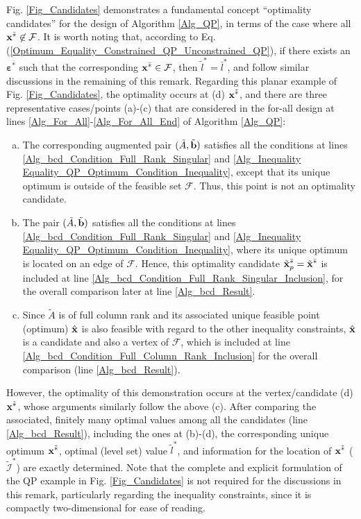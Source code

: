 \documentclass{imaman}
\newcommand{\bfb}{{\bf b}}
\newcommand{\bfx}{{\bf x}}
\newcommand{\bfvarepsilon}{{\boldsymbol \varepsilon}}
\newcommand{\calF}{{\mathcal F}}
\newcommand{\calI}{{\mathcal I}}
\numberwithin{equation}{section}
\begin{document}
\begin{remark}
Fig. \ref{Fig_Candidates} demonstrates a fundamental concept ``optimality candidates'' for the design of Algorithm \ref{Alg_QP}, in terms of the case where all $\bfx^{\bar *}\not\in\calF$. It is worth noting that, according to Eq. (\ref{Optimum_Equality_Constrained_QP_Unconstrained_QP}), if there exists an $\bfvarepsilon^{\bar *}$ such that the corresponding $\bfx^{\bar *}\in\calF$, then $\tilde l^*=\bar l^*$, and follow similar discussions in the remaining of this remark. Regarding this planar example of Fig. \ref{Fig_Candidates}, the optimality occurs at (d) $\bfx^{\tilde *}$, and there are three representative cases/points (a)-(c) that are considered in the for-all design at lines \ref{Alg_For_All}-\ref{Alg_For_All_End} of Algorithm \ref{Alg_QP}:
\begin{enumerate}[a)]
\item The corresponding augmented pair $(\tilde A,\tilde\bfb)$ satisfies all the conditions at lines \ref{Alg_bcd_Condition_Full_Rank_Singular} and \ref{Alg_Inequality Equality_QP_Optimum_Condition_Inequality}, except that its unique optimum is outside of the feasible set $\calF$. Thus, this point is not an optimality candidate.
\item The pair $(\tilde A, \tilde\bfb)$ satisfies all the conditions at lines \ref{Alg_bcd_Condition_Full_Rank_Singular} and \ref{Alg_Inequality Equality_QP_Optimum_Condition_Inequality}, where its unique optimum is located on an edge of $\calF$. Hence, this optimality candidate $\tilde\bfx_p^{\bar *}=\tilde\bfx^{\bar *}$ is included at line \ref{Alg_bcd_Condition_Full_Rank_Singular_Inclusion}, for the overall comparison later at line \ref{Alg_bcd_Result}.
\item Since $\tilde A$ is of full column rank and its associated unique feasible point (optimum) $\hat\bfx$ is also feasible with regard to the other inequality constraints, $\hat\bfx$ is a candidate and also a vertex of $\calF$, which is included at line \ref{Alg_bcd_Condition_Full_Column_Rank_Inclusion} for the overall comparison (line \ref{Alg_bcd_Result}).
\end{enumerate}
However, the optimality of this demonstration occurs at the vertex/candidate (d) $\bfx^{\tilde *}$, whose arguments similarly follow the above (c). After comparing the associated, finitely many optimal values among all the candidates (line \ref{Alg_bcd_Result}), including the ones at (b)-(d), the corresponding unique optimum $\bfx^{\tilde *}$, optimal (level set) value $\tilde l^*$, and information for the location of $\bfx^{\tilde *}$ ($\tilde\calI^*$) are exactly determined. Note that the complete and explicit formulation of the QP example in Fig. \ref{Fig_Candidates} is not required for the discussions in this remark, particularly regarding the inequality constraints, since it is compactly two-dimensional for ease of reading.
\label{Rem_Candidates}
\end{remark}
\end{document}
